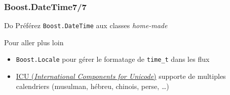 \documentclass[C++.tex]{subfiles}
\begin{document}
\begin{frame}[fragile]
	\frametitle{Boost.DateTime\titlehfill{}7/7}
	\begin{exampleblock}{Do}
		Préférez \lstinline|Boost.DateTime| aux classes \textit{home-made}

	\end{exampleblock}

	\begin{block}{Pour aller plus loin}
		\begin{itemize}
			\item \lstinline|Boost.Locale| pour gérer le formatage de \lstinline|time_t| dans les flux


			\item \href{http://site.icu-project.org/}{ICU (\textit{International Components for Unicode})} supporte de multiples calendriers (musulman, hébreu, chinois, perse, \ldots)

		\end{itemize}
	\end{block}
\end{frame}
\end{document}

